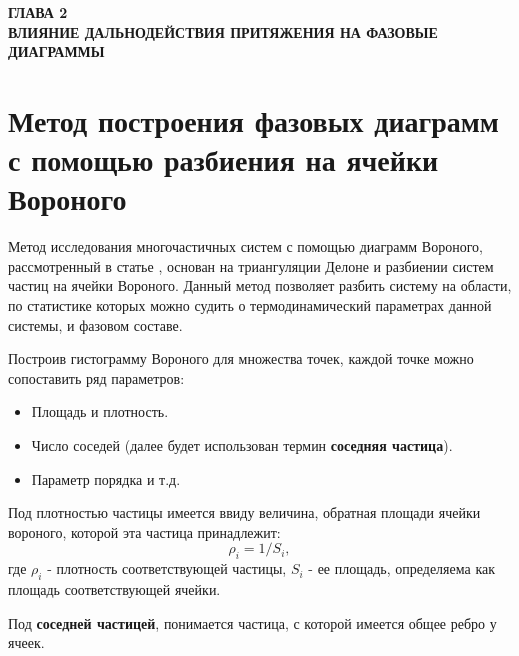 
\newpage
\begin{center}
\textbf{ГЛАВА 2}\\
\textbf{ВЛИЯНИЕ ДАЛЬНОДЕЙСТВИЯ ПРИТЯЖЕНИЯ НА ФАЗОВЫЕ ДИАГРАММЫ}
\end{center}



\section{Метод построения фазовых диаграмм с помощью разбиения на ячейки Вороного}\label{C2_1}

Метод исследования многочастичных систем с помощью диаграмм Вороного, рассмотренный в статье \cite{Ovcharov2017}, основан на триангуляции Делоне и разбиении систем частиц на ячейки Вороного. Данный метод позволяет разбить систему на области, по статистике которых можно судить о термодинамический параметрах данной системы, и фазовом составе.

Построив гистограмму Вороного для множества точек, каждой точке можно сопоставить ряд параметров:
\begin{itemize}
\item Площадь и плотность.
\item Число соседей (далее будет использован термин \textbf{соседняя частица}).
\item Параметр порядка и т.д.
\end{itemize}

Под плотностью частицы имеется ввиду величина, обратная площади ячейки вороного, которой эта частица принадлежит:
\begin{equation}
\rho_i = 1 / S_i,
\label{eqRho}
\end{equation}
где $\rho_i$ - плотность соответствующей частицы, $S_i$ - ее площадь, определяема как площадь соответствующей ячейки.

Под \textbf{соседней частицей}, понимается частица, с которой имеется общее ребро у ячеек.

